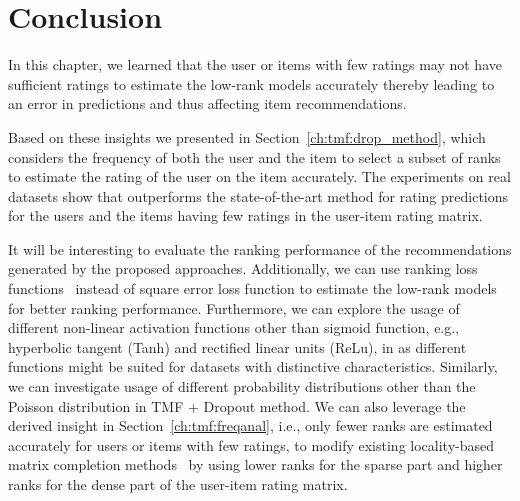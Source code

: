 \section{Conclusion} 
\label{ch:tmf:conclusion}

In this chapter, we learned that the user or items with few ratings may not have 
sufficient ratings to estimate the low-rank models accurately thereby
leading to an error in predictions and thus affecting item recommendations.

Based on these insights we presented \TMF in Section~\ref{ch:tmf:drop_method}, which considers the frequency of
both the user and the item to select a subset of ranks to estimate
the rating of the user on the item accurately. 
The experiments on real datasets show that \TMF outperforms the
state-of-the-art \MF method
for rating predictions for the users and the items having few ratings in the
user-item rating matrix.


It will be interesting to evaluate the ranking performance of
the recommendations generated by the proposed approaches. Additionally, we can
use ranking loss functions~\cite{shi2012climf,rendle2009bpr} instead of square error loss function to estimate
the low-rank models for better ranking performance.
Furthermore, we can explore the usage of different non-linear activation
functions other than sigmoid function, e.g.,  hyperbolic tangent (Tanh) and
rectified linear units (ReLu), in \TMF as different functions might be suited for
datasets with distinctive characteristics. Similarly, we can investigate usage
of different probability distributions other than the Poisson distribution in TMF + Dropout
method. 
We can also leverage the derived insight in Section~\ref{ch:tmf:freqanal}, i.e., only fewer ranks
are estimated accurately for users or items with few ratings,  to modify
existing locality-based  matrix completion methods~\cite{lee2013local,
lee2014local,chen2015wemarec} by using lower ranks for
the sparse part and higher ranks for the dense part of the user-item rating
matrix.

